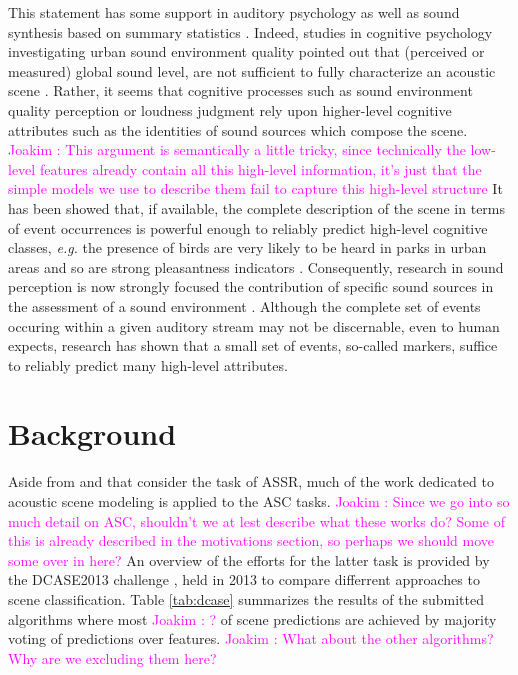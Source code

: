 \documentclass[journal]{IEEEtran}
\newcommand{\ja}[1]{\textcolor{magenta}{Joakim : #1}}
\begin{document}
This statement has some support in auditory psychology as well as sound synthesis based on summary statistics \cite{mcdermott2013summary}. Indeed, studies in cognitive psychology investigating urban sound environment quality pointed out that (perceived or measured) global sound level, are not sufficient to fully characterize an acoustic scene \cite{guyot2005urban,kang2006urban}. Rather, it seems that cognitive processes such as sound environment quality perception \cite{dubois2006cognitive} or loudness judgment \cite{kuwano_memory_2003} rely upon higher-level cognitive attributes such as the identities of sound sources which compose the scene. \ja{This argument is semantically a little tricky, since technically the low-level features already contain all this high-level information, it's just that the simple models we use to describe them fail to capture this high-level structure} It has been showed that, if available, the complete description of the scene in terms of event occurrences is powerful enough to reliably predict high-level cognitive classes, \textit{e.g.} the presence of birds are very likely to be heard in parks in urban areas and so are strong pleasantness indicators \cite{lafayPartI}. Consequently, research in sound perception is now strongly focused the contribution of specific sound sources in the assessment of a sound environment \cite{ricciardi2015sound,lavandier2006contribution}. Although the complete set of events occuring within a given auditory stream may not be discernable, even to human expects, research has shown that a small set of events, so-called markers, suffice to reliably predict many high-level attributes.

\section{Background} \label{sec:soa}

Aside from \cite{aucouturier2007bag} and \cite{lagrange:hal-01082501} that consider the task of ASSR, much of the work dedicated to acoustic scene modeling is applied to the ASC tasks. \ja{Since we go into so much detail on ASC, shouldn't we at lest describe what these works do? Some of this is already described in the motivations section, so perhaps we should move some over in here?}
An overview of the efforts for the latter task is provided by the DCASE2013 challenge \cite{barchiesi2015acoustic}, held in 2013 to compare differrent approaches to scene classification. Table \ref{tab:dcase} summarizes the results of the submitted algorithms where most \ja{?} of scene predictions are achieved by majority voting of predictions over features. \ja{What about the other algorithms? Why are we excluding them here?}
\end{document}
